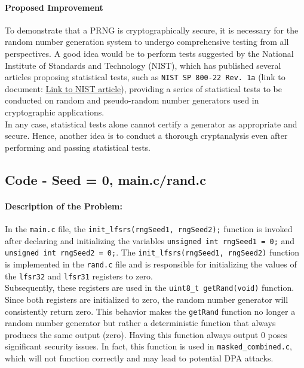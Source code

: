 \documentclass[12pt]{article}
\begin{document}
    \paragraph{Proposed Improvement} 
    To demonstrate that a PRNG is cryptographically secure, it is necessary for the random number generation system to undergo comprehensive testing from all perspectives. A good idea would be to perform tests suggested by the National Institute of Standards and Technology (NIST), which has published several articles proposing statistical tests, such as \texttt{NIST SP 800-22 Rev. 1a} (link to document: \href{https://csrc.nist.gov/pubs/sp/800/22/r1/upd1/final}{Link to NIST article}), providing a series of statistical tests to be conducted on random and pseudo-random number generators used in cryptographic applications.
    \\
    In any case, statistical tests alone cannot certify a generator as appropriate and secure. Hence, another idea is to conduct a thorough cryptanalysis even after performing and passing statistical tests.

\subsection{Code - Seed = 0, main.c/rand.c}
    \paragraph{Description of the Problem:}
    In the \texttt{main.c} file, the \texttt{init\_lfsrs(rngSeed1, rngSeed2);} function is invoked after declaring and initializing the variables \texttt{unsigned int rngSeed1 = 0;} and \texttt{unsigned int rngSeed2 = 0;}. The \verb|init_lfsrs(rngSeed1, rngSeed2)| function is implemented in the \texttt{rand.c} file and is responsible for initializing the values of the \texttt{lfsr32} and \texttt{lfsr31} registers to zero.
    \\
    Subsequently, these registers are used in the \verb|uint8_t getRand(void)| function. Since both registers are initialized to zero, the random number generator will consistently return zero. This behavior makes the \verb|getRand| function no longer a random number generator but rather a deterministic function that always produces the same output (zero).
    Having this function always output 0 poses significant security issues. In fact, this function is used in \texttt{masked\_combined.c}, which will not function correctly and may lead to potential DPA attacks.
\end{document}
